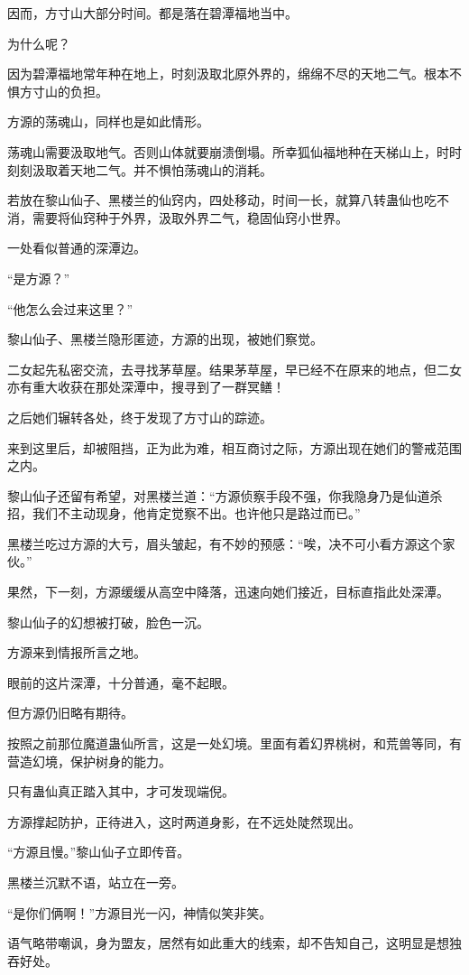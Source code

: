 \begin{this_body}
因而，方寸山大部分时间。都是落在碧潭福地当中。

为什么呢？

因为碧潭福地常年种在地上，时刻汲取北原外界的，绵绵不尽的天地二气。根本不惧方寸山的负担。

方源的荡魂山，同样也是如此情形。

荡魂山需要汲取地气。否则山体就要崩溃倒塌。所幸狐仙福地种在天梯山上，时时刻刻汲取着天地二气。并不惧怕荡魂山的消耗。

若放在黎山仙子、黑楼兰的仙窍内，四处移动，时间一长，就算八转蛊仙也吃不消，需要将仙窍种于外界，汲取外界二气，稳固仙窍小世界。

一处看似普通的深潭边。

“是方源？”

“他怎么会过来这里？”

黎山仙子、黑楼兰隐形匿迹，方源的出现，被她们察觉。

二女起先私密交流，去寻找茅草屋。结果茅草屋，早已经不在原来的地点，但二女亦有重大收获在那处深潭中，搜寻到了一群冥鳝！

之后她们辗转各处，终于发现了方寸山的踪迹。

来到这里后，却被阻挡，正为此为难，相互商讨之际，方源出现在她们的警戒范围之内。

黎山仙子还留有希望，对黑楼兰道：“方源侦察手段不强，你我隐身乃是仙道杀招，我们不主动现身，他肯定觉察不出。也许他只是路过而已。”

黑楼兰吃过方源的大亏，眉头皱起，有不妙的预感：“唉，决不可小看方源这个家伙。”

果然，下一刻，方源缓缓从高空中降落，迅速向她们接近，目标直指此处深潭。

黎山仙子的幻想被打破，脸色一沉。

方源来到情报所言之地。

眼前的这片深潭，十分普通，毫不起眼。

但方源仍旧略有期待。

按照之前那位魔道蛊仙所言，这是一处幻境。里面有着幻界桃树，和荒兽等同，有营造幻境，保护树身的能力。

只有蛊仙真正踏入其中，才可发现端倪。

方源撑起防护，正待进入，这时两道身影，在不远处陡然现出。

“方源且慢。”黎山仙子立即传音。

黑楼兰沉默不语，站立在一旁。

“是你们俩啊！”方源目光一闪，神情似笑非笑。

语气略带嘲讽，身为盟友，居然有如此重大的线索，却不告知自己，这明显是想独吞好处。


\end{this_body}
